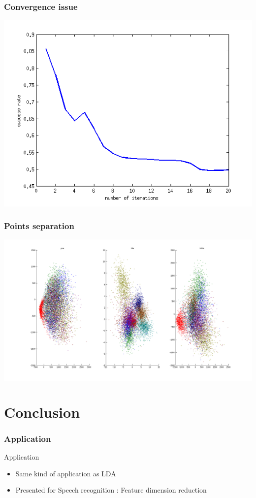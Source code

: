 \documentclass[smaller,pdf,svgnames]{beamer}
\begin{document}
\begin{frame}
  \frametitle{Convergence issue}
  \centering\includegraphics[scale=0.70]{../img/bench-iterations}
\end{frame}

\begin{frame}
  \frametitle{Points separation}
  \centering\includegraphics[scale=0.30]{../img/classif}
\end{frame}

\section{Conclusion}

\begin{frame}
  \frametitle{Application}
  \begin{block}{Application}
    \begin{itemize}
    \item Same kind of application as LDA
    \item Presented for Speech recognition : Feature dimension reduction
    \end{itemize}
  \end{block}
\end{frame}
\end{document}
